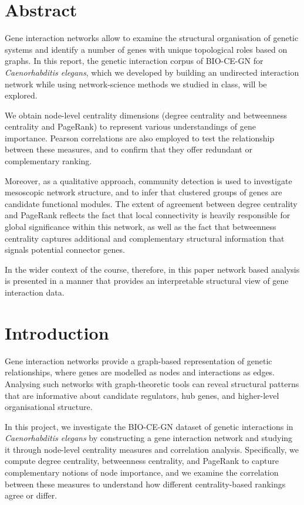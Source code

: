 \section{Abstract}
Gene interaction networks allow to examine the structural organisation of genetic systems and identify a number of genes with unique topological roles based on graphs. In this report, the genetic interaction corpus of BIO-CE-GN for \textit{Caenorhabditis elegans}, which we developed by building an undirected interaction network while using network-science methods we studied in class, will be explored.

We obtain node-level centrality dimensions (degree centrality and betweenness centrality and PageRank) to represent various understandings of gene importance. Pearson correlations are also employed to test the relationship between these measures, and to confirm that they offer redundant or complementary ranking.

Moreover, as a qualitative approach, community detection is used to investigate mesoscopic network structure, and to infer that clustered groups of genes are candidate functional modules. The extent of agreement between degree centrality and PageRank reflects the fact that local connectivity is heavily responsible for global significance within this network, as well as the fact that betweenness centrality captures additional and complementary structural information that signals potential connector genes.

In the wider context of the course, therefore, in this paper network based analysis is presented in a manner that provides an interpretable structural view of gene interaction data.

\section{Introduction}

Gene interaction networks provide a graph-based representation of genetic relationships, where genes are modelled as nodes and interactions as edges. Analysing such networks with graph-theoretic tools can reveal structural patterns that are informative about candidate regulators, hub genes, and higher-level organisational structure.

In this project, we investigate the BIO-CE-GN dataset of genetic interactions in \textit{Caenorhabditis elegans} by constructing a gene interaction network and studying it through node-level centrality measures and correlation analysis. Specifically, we compute degree centrality, betweenness centrality, and PageRank to capture complementary notions of node importance, and we examine the correlation between these measures to understand how different centrality-based rankings agree or differ.

